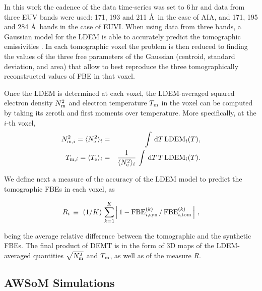 \documentclass[namedreferences]{solarphysics}
\newcommand{\LDEM}{{\rm LDEM}}
\newcommand{\FBE}{{\rm FBE}}
\newcommand{\Te}{T_{\rm e}}
\newcommand{\Tm}{T_{\rm m}}
\newcommand{\Tmi}{T_{{\rm m},i}}
\newcommand{\Ne}{N_{\rm e}}
\newcommand{\Nm}{N_{\rm m}}
\newcommand{\Nsqmi}{N^2_{{\rm m},i}}
\newcommand{\Nsqm}{N^2_{{\rm m}}}
\newcommand{\sqravgN}{\sqrt{\Nsqm}}
\def\notebyalbert#1{\textcolor{blue}{NOTE: #1}}
\begin{document}
\begin{article}
{In this work the cadence of the data time-series was set to 6\,hr and} data from three EUV bands were {used:} 171, 193 and 211 \AA \ in {the} case of AIA, and 171, 195 and 284 \AA \ bands in {the} case of EUVI. When using data from {three bands}, a Gaussian model for the LDEM is able to accurately predict the tomographic emissivities \citep{frazin_2009,nuevo_2015}. In each tomographic voxel the problem is then reduced to finding the values of the three free parameters of the Gaussian (centroid, standard deviation, and area) that allow to best reproduce the three tomographically reconstructed values of FBE in that voxel.

Once the LDEM is determined at each voxel, {the LDEM-averaged squared electron density $\Nm^2$ and electron temperature $\Tm$} in the voxel can be computed by taking its zeroth and first moments over temperature. More specifically, at the $i$-th voxel,
{
\begin{eqnarray}\label{momento1}
 \Nsqmi = \langle \Ne^2 \rangle_i &=& \int\,\textrm{d}T\,\LDEM_i(T),\label{Ne} \\ 
\label{momento2}
 \Tmi  = \langle \Te \rangle_i &=& \frac{1}{\langle \Ne^2 \rangle_i}\,\int\,\textrm{d}T\,T\,\LDEM_i(T).\label{Tm} 
\end{eqnarray}
}

We define next a measure of the accuracy of the LDEM model to predict the tomographic FBEs in each voxel, as

\begin{equation}\label{R}
R_i \, \equiv \ (1/K) \, \sum_{k=1}^K \left| \, 1 - \FBE^{(k)}_{i,\rm syn}\,/\,\FBE^{(k)}_{i,\rm tom}\, \right| \,,
\end{equation}

\noindent 
{being the} average relative difference between the tomographic and the synthetic FBEs. {The final product of DEMT is in the form of 3D maps of the LDEM-averaged quantities $\sqravgN$ and $\Tm$, as well as of the measure $R$.}

\subsection{{AWSoM Simulations}}\label{awsom} 



\end{article}
\end{document}
